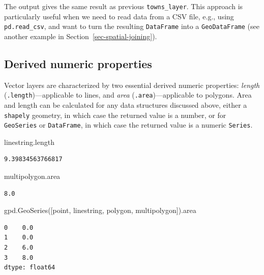 \documentclass[
  letterpaper,
]{krantz}
\newenvironment{Shaded}{\begin{snugshade}}{\end{snugshade}}
\newcommand{\NormalTok}[1]{\textcolor[rgb]{0.00,0.23,0.31}{#1}}
\begin{document}
The output gives the same result as previous \texttt{towns\_layer}. This
approach is particularly useful when we need to read data from a CSV
file, e.g., using \texttt{pd.read\_csv}, and want to turn the resulting
\texttt{DataFrame} into a \texttt{GeoDataFrame} (see another example in
Section~\ref{sec-spatial-joining}).

\subsection{Derived numeric properties}\label{sec-area-length}

Vector layers are characterized by two essential derived numeric
properties: \emph{length} (\texttt{.length})---applicable to lines, and
\emph{area} (\texttt{.area})---applicable to polygons. Area and length
can be calculated for any data structures discussed above, either a
\texttt{shapely} geometry, in which case the returned value is a number,
or for \texttt{GeoSeries} or \texttt{DataFrame}, in which case the
returned value is a numeric \texttt{Series}.

\begin{Shaded}
\begin{Highlighting}[]
\NormalTok{linestring.length}
\end{Highlighting}
\end{Shaded}

\begin{verbatim}
9.39834563766817
\end{verbatim}

\begin{Shaded}
\begin{Highlighting}[]
\NormalTok{multipolygon.area}
\end{Highlighting}
\end{Shaded}

\begin{verbatim}
8.0
\end{verbatim}

\begin{Shaded}
\begin{Highlighting}[]
\NormalTok{gpd.GeoSeries([point, linestring, polygon, multipolygon]).area}
\end{Highlighting}
\end{Shaded}

\begin{verbatim}
0    0.0
1    0.0
2    6.0
3    8.0
dtype: float64
\end{verbatim}
\end{document}
